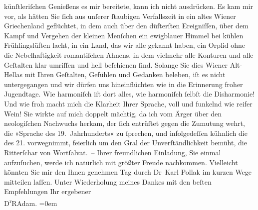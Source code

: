 \begin{ledgroupsized}[t]{13cm}
               künſtleriſchen Genießens es mir bereitete, kann ich nicht ausdrücken. Es kam mir vor,
               als hätten Sie ſich aus unſerer ſtaubigen Verfallszeit in ein altes Wiener Griechenland
               geflüchtet, in dem auch über den düſterſten Ereigniſſen, über dem Kampf und Vergehen
                  der kleinen Menſchen ein ewigblauer
               Himmel bei kühlen Frühlingslüften lacht, in ein Land, das wir alle gekannt haben, ein
               Orplid ohne die Nebelhaftigkeit romantiſchen Ahnens, in dem vielmehr alle Konturen
               und alle Geſtalten klar umriſſen und hell beſchienen ſind. Solange Sie dies Wiener Alt-Hellas mit Ihren Geſtalten, Gefühlen und Gedanken beleben, iſt es nicht
               untergegangen und wir dürfen uns hineinflüchten wie in die Erinnerung froher
               Jugendtage. Wie harmoniſch iſt dort alles, wie harmoniſch ſelbſt die Disharmonie! Und
               wie froh macht mich die Klarheit Ihrer {\pb}Sprache, voll und funkelnd wie reifer Wein! Sie wirkte auf mich doppelt mächtig, da
               ich vom Ärger über den neologiſchen Nachwuchs herkam, der ſich entrüſtet gegen die
               Zumutung wehrt, die »Sprache des 19. Jahrhunderts« zu ſprechen, und infolgedeſſen
               kühnlich die des 21. vorwegnimmt, feierlich um den Gral der Unverſtändlichkeit
               bemüht, die Ritterſchar von Wortſalvat. –\pend
           \pstart
           Ihrer freundlichen Einladung, Sie einmal aufzuſuchen, werde ich natürlich mit größter
               Freude nachkommen. Vielleicht könnten Sie mir den Ihnen genehmen Tag durch Dr Karl Pollak im kurzen Wege mitteilen
               laſſen.\pend
           \pstart
           {\pb}Unter Wiederholung meines Dankes mit den
               beſten Empfehlungen\pend
           \pstart
           Ihr ergebener{\\[\baselineskip]}\spacefill\mbox{D\textsuperscript{r}RAdam.}\pend
           \leftskip=0em{}
         
         \endnumbering{}\end{ledgroupsized}  \newcommand{\dateiname}{L02485}\newcommand{\titel}{Robert Adam an Arthur Schnitzler, 1. 5. 1927}\newcommand{\editorInnen}{Martin Anton Müller und Gerd-Hermann Susen}
      